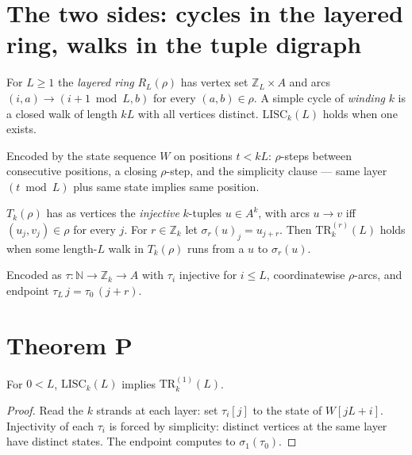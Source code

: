 \section{The two sides: cycles in the layered ring, walks in the tuple digraph}

\begin{definition}
\label{def:lisc}
\leanok
For $L \geq 1$ the \emph{layered ring} $R_L(\rho)$ has vertex set
$\mathbb{Z}_L \times A$ and arcs $(i,a) \to (i+1 \bmod L, b)$ for every
$(a,b) \in \rho$. A simple cycle of \emph{winding} $k$ is a closed walk of
length $kL$ with all vertices distinct. $\mathrm{LISC}_k(L)$ holds when one
exists.

Encoded by the state sequence $W$ on positions $t < kL$: $\rho$-steps between
consecutive positions, a closing $\rho$-step, and the simplicity clause ---
same layer $(t \bmod L)$ plus same state implies same position.
\end{definition}

\begin{definition}
\label{def:tr}
\leanok
$T_k(\rho)$ has as vertices the \emph{injective} $k$-tuples $u \in A^k$, with
arcs $u \to v$ iff $(u_j, v_j) \in \rho$ for every $j$. For $r \in \mathbb{Z}_k$
let $\sigma_r(u)_j = u_{j+r}$. Then $\mathrm{TR}_k^{(r)}(L)$ holds when some
length-$L$ walk in $T_k(\rho)$ runs from a $u$ to $\sigma_r(u)$.

Encoded as $\tau : \mathbb{N} \to \mathbb{Z}_k \to A$ with $\tau_i$ injective
for $i \leq L$, coordinatewise $\rho$-arcs, and endpoint
$\tau_L\,j = \tau_0\,(j+r)$.
\end{definition}

\section{Theorem P}

\begin{lemma}
\label{lem:extraction}
\leanok
{}
For $0 < L$, $\mathrm{LISC}_k(L)$ implies $\mathrm{TR}_k^{(1)}(L)$.
\end{lemma}

\begin{proof}
\leanok
{}
Read the $k$ strands at each layer: set $\tau_i[j]$ to the state of $W[jL+i]$.
Injectivity of each $\tau_i$ is forced by simplicity: distinct vertices at the
same layer have distinct states. The endpoint computes to $\sigma_1(\tau_0)$.
\end{proof}

